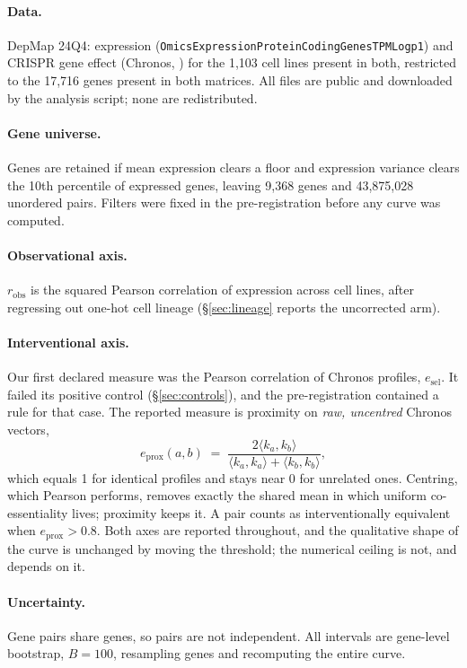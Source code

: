 \documentclass[11pt]{article}
\begin{document}
\paragraph{Data.} DepMap 24Q4: expression (\texttt{OmicsExpression\-Protein\-Coding\-GenesTPMLogp1})
and CRISPR gene effect (Chronos, \citealp{dempster2021}) for the
1,103 cell lines present in both, restricted to the 17,716 genes present in
both matrices. All files are public and downloaded by the analysis script;
none are redistributed.

\paragraph{Gene universe.} Genes are retained if mean expression clears a
floor and expression variance clears the 10th percentile of expressed genes,
leaving 9,368 genes and 43,875,028 unordered pairs. Filters were fixed in
the pre-registration before any curve was computed.

\paragraph{Observational axis.} $r_{\mathrm{obs}}$ is the squared Pearson
correlation of expression across cell lines, after regressing out one-hot
cell lineage (\S\ref{sec:lineage} reports the uncorrected arm).

\paragraph{Interventional axis.} Our first declared measure was the Pearson
correlation of Chronos profiles, $e_{\mathrm{sel}}$. It failed its positive
control (\S\ref{sec:controls}), and the pre-registration contained a rule
for that case. The reported measure is proximity on \emph{raw, uncentred}
Chronos vectors,
\[
  e_{\mathrm{prox}}(a,b) \;=\;
  \frac{2\langle k_a, k_b\rangle}{\langle k_a,k_a\rangle + \langle k_b,k_b\rangle},
\]
which equals 1 for identical profiles and stays near 0 for unrelated ones.
Centring, which Pearson performs, removes exactly the shared mean in which
uniform co-essentiality lives; proximity keeps it. A pair counts as
interventionally equivalent when $e_{\mathrm{prox}} > 0.8$. Both axes are
reported throughout, and the qualitative shape of the curve is unchanged by
moving the threshold; the numerical ceiling is not, and depends on it.

\paragraph{Uncertainty.} Gene pairs share genes, so pairs are not
independent. All intervals are gene-level bootstrap, $B=100$, resampling
genes and recomputing the entire curve.
\end{document}
